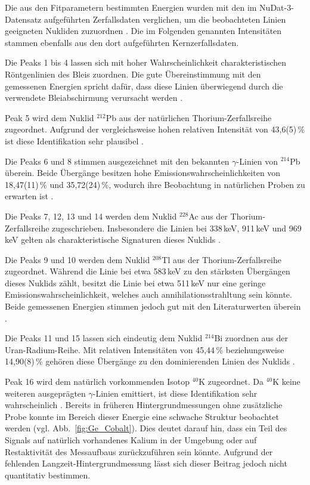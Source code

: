 Die aus den Fitparametern bestimmten Energien wurden mit den im NuDat-3-Datensatz aufgeführten Zerfallsdaten verglichen, um die beobachteten Linien geeigneten Nukliden zuzuordnen \cite{NuDat3}. Die im Folgenden genannten Intensitäten stammen ebenfalls aus den dort aufgeführten Kernzerfallsdaten.

Die Peaks 1 bis 4 lassen sich mit hoher Wahrscheinlichkeit charakteristischen Röntgenlinien des Bleis zuordnen. 
Die gute Übereinstimmung mit den gemessenen Energien spricht dafür, dass diese Linien überwiegend durch die verwendete Bleiabschirmung verursacht werden \cite{NIST_Xray}.

Peak 5 wird dem Nuklid $^{212}$Pb aus der natürlichen Thorium-Zerfallsreihe zugeordnet. 
Aufgrund der vergleichsweise hohen relativen Intensität von 43,6(5)\,\% ist diese Identifikation sehr plausibel \cite{Auranen2020_212Pb}.

Die Peaks 6 und 8 stimmen ausgezeichnet mit den bekannten $\gamma$-Linien von $^{214}$Pb überein. 
Beide Übergänge besitzen hohe Emissionswahrscheinlichkeiten von 18,47(11)\,\% und 35,72(24)\,\%, wodurch ihre Beobachtung in natürlichen Proben zu erwarten ist \cite{Zhu2021_214Pb}.

Die Peaks 7, 12, 13 und 14 werden dem Nuklid $^{228}$Ac aus der Thorium-Zerfallsreihe zugeschrieben. 
Insbesondere die Linien bei 338\,keV, 911\,keV und 969\,keV gelten als charakteristische Signaturen dieses Nuklids \cite{Abusaleem2014_228Ac}.

Die Peaks 9 und 10 werden dem Nuklid $^{208}$Tl aus der Thorium-Zerfallsreihe zugeordnet.
Während die Linie bei etwa 583\,keV zu den stärksten Übergängen dieses Nuklids zählt, besitzt die Linie bei etwa 511\,keV nur eine geringe Emissionswahrscheinlichkeit, welches auch annihilationsstrahltung sein könnte. Beide gemessenen Energien stimmen jedoch gut mit den Literaturwerten überein \cite{Martin2007_208Tl}.

Die Peaks 11 und 15 lassen sich eindeutig dem Nuklid $^{214}$Bi zuordnen aus der Uran-Radium-Reihe. 
Mit relativen Intensitäten von 45,44\,\% beziehungsweise 14,90(8)\,\% gehören diese Übergänge zu den dominierenden Linien des Nuklids \cite{Zhu2021_214Pb}.

Peak 16 wird dem natürlich vorkommenden Isotop $^{40}$K zugeordnet.
Da $^{40}$K keine weiteren ausgeprägten $\gamma$-Linien emittiert, ist diese Identifikation sehr wahrscheinlich \cite{Chen2017_40K}.
Bereits in früheren Hintergrundmessungen ohne zusätzliche Probe konnte im Bereich dieser Energie eine schwache Struktur beobachtet werden (vgl. Abb.~\ref{fig:Ge_Cobalt}).
Dies deutet darauf hin, dass ein Teil des Signals auf natürlich vorhandenes Kalium in der Umgebung oder auf Restaktivität des Messaufbaus zurückzuführen sein könnte.
Aufgrund der fehlenden Langzeit-Hintergrundmessung lässt sich dieser Beitrag jedoch nicht quantitativ bestimmen.


